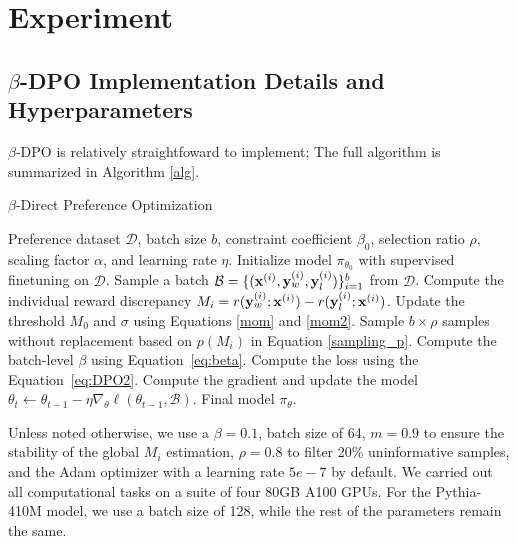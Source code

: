 \section{Experiment}
\label{exp_appendix}
\subsection{$\beta$-DPO Implementation Details and Hyperparameters}
\label{setup_exp}
$\beta$-DPO is relatively straightfoward to implement; The full algorithm is summarized in Algorithm \ref{alg}.

\begin{algorithm}[h]
    \caption{$\beta$-Direct Preference Optimization}\label{alg:beta-dpo}
    \begin{algorithmic}[1]
    \REQUIRE Preference dataset $\mathcal{D}$, batch size $b$, constraint coefficient $\beta_0$, selection ratio $\rho$, scaling factor $\alpha$, and learning rate $\eta$.
    \STATE Initialize model $\pi_{\theta_0}$ with supervised finetuning on $\mathcal{D}$.
        \STATE Sample a batch $\mathcal{B} = \{(\mathbf{x}^{(i)}, \mathbf{y}_w^{(i)}, \mathbf{y}_l^{(i)})\}_{i=1}^b$ from $\mathcal{D}$.
        \STATE Compute the individual reward discrepancy $M_i = r(\mathbf{y}_w^{(i)};\mathbf{x}^{(i)})-r(\mathbf{y}_l^{(i)};\mathbf{x}^{(i)})$.
        \STATE Update the threshold $M_0$ and $\sigma$ using Equations \eqref{mom} and \eqref{mom2}.
        \STATE Sample $b \times \rho$ samples without replacement based on $p(M_i)$ in Equation \eqref{sampling_p}.
        \STATE Compute the batch-level $\beta$ using Equation~\eqref{eq:beta}.
        \STATE Compute the loss using the Equation~\eqref{eq:DPO2}.
        \STATE Compute the gradient and update the model $\theta_t \leftarrow \theta_{t-1} - \eta \nabla_\theta  \ell(\theta_{t-1}, \mathcal{B})$.
    \ENDWHILE
\RETURN Final model $\pi_{\theta}$.
\end{algorithmic}
\label{alg}
\end{algorithm}

Unless noted otherwise, we use a $\beta=0.1$, batch size of 64, $m=0.9$ to ensure the stability of the global $M_i$ estimation, $\rho=0.8$ to filter 20\% uninformative samples, and the Adam optimizer with a learning rate $5e-7$ by default.  We carried out all computational tasks on a suite of four 80GB A100 GPUs. For the Pythia-410M model, we use a batch size of 128, while the rest of the parameters remain the same.

